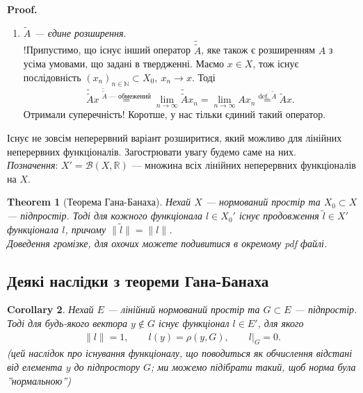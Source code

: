 \documentclass[a4paper, 10pt]{article}
\makeatletter
\theoremstyle{theoremdd}
\newtheorem{theorem}{Theorem}[subsection]
\theoremstyle{theoremdd}
\theoremstyle{theoremdd}
\theoremstyle{theoremdd}
\theoremstyle{theoremdd}
\theoremstyle{theoremdd}
\theoremstyle{theoremdd}
\theoremstyle{theoremdd}
\newtheorem{corollary}[theorem]{Corollary}
\renewenvironment{proof}[1][Proof.\\]{\par
\pushQED{\hfill \qed}%
\normalfont \topsep6\p@\@plus6\p@\relax
\trivlist
\item\relax
{\bfseries
#1\@addpunct{.}}\hspace\labelsep\ignorespaces
}{%
\popQED\endtrivlist\@endpefalse
}
\makeatother
\begin{document}
\begin{proof}
\begin{enumerate}[wide=0pt,label={\Roman*.}]
\item \textit{$\tilde{A}$ --- єдине розширення}.\\
!Припустимо, що існує інший оператор $\tilde{\tilde{A}}$, яке також є розширенням $A$ з усіма умовами, що задані в твердженні. Маємо $x \in X$, тож існує послідовність $(x_n)_{n \in \mathbb{N}} \subset X_0,\ x_n \to x$. Тоді
\[
\tilde{\tilde{A}}x \overset{\tilde{\tilde{A}} \text{ --- обмежений}}{=} \displaystyle\lim_{n \to \infty} \tilde{\tilde{A}}x_n = \lim_{n \to \infty} Ax_n \overset{\text{def. } \tilde{A}}{=} \tilde{A}x.
\] 
Отримали суперечність! Коротше, у нас тільки єдиний такий оператор. \qedhere
\end{enumerate}
\end{proof}
\noindent
Існує не зовсім неперервний варіант розширитися, який можливо для лінійних неперервних функціоналів. Загострювати увагу будемо саме на них.
\bigskip \\
\textit{Позначення}: $X' = \mathcal{B}(X,\mathbb{R})$ --- множина всіх лінійних неперервних функціоналів на $X$.

\begin{theorem}[Теорема Гана-Банаха]
Нехай $X$ --- нормований простір та $X_0 \subset X$ --- підпростір. Тоді для кожного функціонала $l \in X_0'$ існує продовження $\tilde{l} \in X'$ функціонала $l$, причому $\| \tilde{l} \| = \|l\|$.\\
\textit{Доведення громізке, для охочих можете подивитися в окремому pdf файлі.}
\end{theorem}

\subsection{Деякі наслідки з теореми Гана-Банаха}
\begin{corollary}
Нехай $E$ --- лінійний нормований простір та $G \subset E$ --- підпростір. Тоді для будь-якого вектора $y \notin G$ існує функціонал $l \in E'$, для якого
\begin{align*}
\|l\| = 1,\qquad l(y) = \rho(y,G),\qquad  l|_G = 0.
\end{align*}
\textit{(цей наслідок про існування функціоналу, що поводиться як обчислення відстані від елемента $y$ до підпростору $G$; ми можемо підібрати такий, щоб норма була ''нормальною'')}
\end{corollary}
\end{document}
